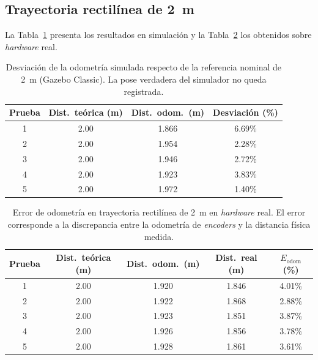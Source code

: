 \begin{appendices}
\subsection{Trayectoria rectilínea de 2~m}

La Tabla~\ref{tab:odom_recta_sim} presenta los resultados en simulación y la
Tabla~\ref{tab:odom_recta_real} los obtenidos sobre \textit{hardware} real.

\begin{table}[H]
\centering
\caption{Desviación de la odometría simulada respecto de la referencia nominal de 2~m (Gazebo Classic). La pose verdadera del simulador no queda registrada.}
\label{tab:odom_recta_sim}
\small
\begin{tabular}{cccc}
\toprule
\textbf{Prueba} & \textbf{Dist.\ teórica (m)} & \textbf{Dist.\ odom.\ (m)} & \textbf{Desviación (\%)} \\
\midrule
1 & 2.00 & 1.866 & 6.69\% \\
2 & 2.00 & 1.954 & 2.28\% \\
3 & 2.00 & 1.946 & 2.72\% \\
4 & 2.00 & 1.923 & 3.83\% \\
5 & 2.00 & 1.972 & 1.40\% \\

\bottomrule
\end{tabular}
\end{table}

\begin{table}[H]
\centering
\caption{Error de odometría en trayectoria rectilínea de 2~m en \textit{hardware} real. El error corresponde a la discrepancia entre la odometría de \textit{encoders} y la distancia física medida.}
\label{tab:odom_recta_real}
\small
\begin{tabular}{ccccc}
\toprule
\textbf{Prueba} & \textbf{Dist.\ teórica (m)} & \textbf{Dist.\ odom.\ (m)} & \textbf{Dist.\ real (m)} & \textbf{$E_{\mathrm{odom}}$ (\%)} \\
\midrule
1 & 2.00 & 1.920 & 1.846 & 4.01\% \\
2 & 2.00 & 1.922 & 1.868 & 2.88\% \\
3 & 2.00 & 1.923 & 1.851 & 3.87\% \\
4 & 2.00 & 1.926 & 1.856 & 3.78\% \\
5 & 2.00 & 1.928 & 1.861 & 3.61\% \\

\bottomrule
\end{tabular}
\end{table}


\end{appendices}
